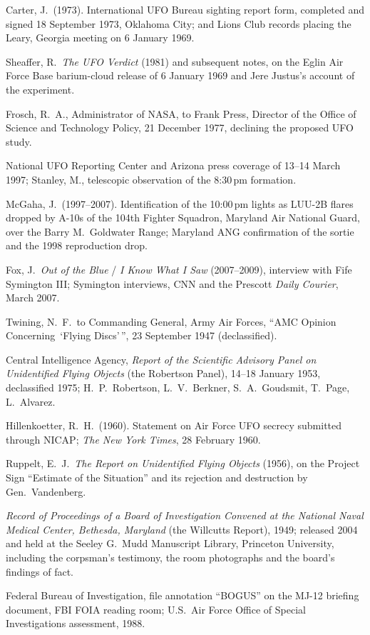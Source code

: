 \begin{srcnotes}
\item Carter, J.\ (1973). International UFO Bureau sighting report form, completed and signed 18
September 1973, Oklahoma City; and Lions Club records placing the Leary, Georgia meeting on 6
January 1969.
\item Sheaffer, R.\ \emph{The UFO Verdict} (1981) and subsequent notes, on the Eglin Air Force
Base barium-cloud release of 6 January 1969 and Jere Justus's account of the experiment.
\item Frosch, R.\ A., Administrator of NASA, to Frank Press, Director of the Office of Science
and Technology Policy, 21 December 1977, declining the proposed UFO study.
\item National UFO Reporting Center and Arizona press coverage of 13--14 March 1997; Stanley, M.,
telescopic observation of the 8:30\,pm formation.
\item McGaha, J.\ (1997--2007). Identification of the 10:00\,pm lights as LUU-2B flares dropped
by A-10s of the 104th Fighter Squadron, Maryland Air National Guard, over the Barry M.\
Goldwater Range; Maryland ANG confirmation of the sortie and the 1998 reproduction drop.
\item Fox, J.\ \emph{Out of the Blue} / \emph{I Know What I Saw} (2007--2009), interview with
Fife Symington III; Symington interviews, CNN and the Prescott \emph{Daily Courier}, March 2007.
\item Twining, N.\ F.\ to Commanding General, Army Air Forces, ``AMC Opinion Concerning
\,`Flying Discs'\,'', 23 September 1947 (declassified).
\item Central Intelligence Agency, \emph{Report of the Scientific Advisory Panel on Unidentified
Flying Objects} (the Robertson Panel), 14--18 January 1953, declassified 1975; H.~P.~Robertson,
L.~V.~Berkner, S.~A.~Goudsmit, T.~Page, L.~Alvarez.
\item Hillenkoetter, R.~H.\ (1960). Statement on Air Force UFO secrecy submitted through NICAP;
\emph{The New York Times}, 28 February 1960.
\item Ruppelt, E.~J.\ \emph{The Report on Unidentified Flying Objects} (1956), on the Project
Sign ``Estimate of the Situation'' and its rejection and destruction by Gen.\ Vandenberg.
\item \emph{Record of Proceedings of a Board of Investigation Convened at the National Naval
Medical Center, Bethesda, Maryland} (the Willcutts Report), 1949; released 2004 and held at the
Seeley G.~Mudd Manuscript Library, Princeton University, including the corpsman's testimony,
the room photographs and the board's findings of fact.
\item Federal Bureau of Investigation, file annotation ``BOGUS'' on the MJ-12 briefing document,
FBI FOIA reading room; U.S.~Air Force Office of Special Investigations assessment, 1988.
\end{srcnotes}
